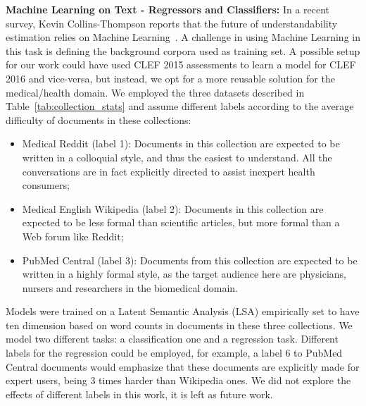 


\textbf{Machine Learning on Text - Regressors and Classifiers:}
In a recent survey, Kevin Collins-Thompson reports that the future of understandability estimation relies on Machine Learning~\cite{collins2014computational}.
A challenge in using Machine Learning in this task is defining the background corpora used as training set.
A possible setup for our work could have used CLEF 2015 assessments to learn a model for CLEF 2016 and vice-versa, but instead, we opt for a 
more reusable solution for the medical/health domain. 
We employed the three datasets described in Table~\ref{tab:collection_stats} and assume different labels according to the average difficulty of documents in these collections:

\begin{itemize}
    \item Medical Reddit (label 1): Documents in this collection are expected to be written in a colloquial style, and thus the easiest to understand. All the conversations are in fact explicitly directed to assist inexpert health consumers;
    \item Medical English Wikipedia (label 2): Documents in this collection are expected to be less formal than scientific articles, but more formal than a Web forum like Reddit;
    \item PubMed Central (label 3): Documents from this collection are expected to be written in a highly formal style, as the target audience here are physicians, nursers and researchers in the biomedical domain.
\end{itemize}

Models were trained on a Latent Semantic Analysis (LSA) empirically set to have ten dimension based on word counts in documents in these three collections.
We model two different tasks: a classification one and a regression task.
Different labels for the regression could be employed, for example, a label 6 to PubMed Central documents would emphasize that these documents are explicitly made for expert users, being 3 times harder than Wikipedia ones. We did not explore the effects of different labels in this work, it is left as future work.

